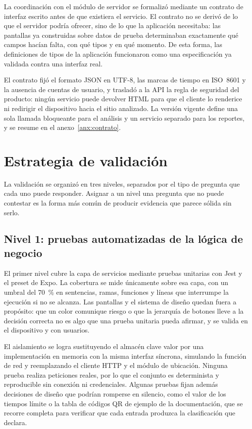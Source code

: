 La coordinación con el módulo de servidor se formalizó mediante un contrato de interfaz escrito antes de que existiera el servicio. El contrato no se derivó de lo que el servidor podría ofrecer, sino de lo que la aplicación necesitaba: las pantallas ya construidas sobre datos de prueba determinaban exactamente qué campos hacían falta, con qué tipos y en qué momento. De esta forma, las definiciones de tipos de la aplicación funcionaron como una especificación ya validada contra una interfaz real.

El contrato fijó el formato JSON en UTF-8, las marcas de tiempo en ISO~8601 y la ausencia de cuentas de usuario, y trasladó a la API la regla de seguridad del producto: ningún servicio puede devolver HTML para que el cliente lo renderice ni redirigir el dispositivo hacia el sitio analizado. La versión vigente define una sola llamada bloqueante para el análisis y un servicio separado para los reportes, y se resume en el anexo~\ref{anx:contrato}.

\section{Estrategia de validación}

La validación se organizó en tres niveles, separados por el tipo de pregunta que cada uno puede responder. Asignar a un nivel una pregunta que no puede contestar es la forma más común de producir evidencia que parece sólida sin serlo.

\subsection{Nivel 1: pruebas automatizadas de la lógica de negocio}

El primer nivel cubre la capa de servicios mediante pruebas unitarias con Jest y el preset de Expo. La cobertura se mide únicamente sobre esa capa, con un umbral del 70~\% en sentencias, ramas, funciones y líneas que interrumpe la ejecución si no se alcanza. Las pantallas y el sistema de diseño quedan fuera a propósito: que un color comunique riesgo o que la jerarquía de botones lleve a la decisión correcta no es algo que una prueba unitaria pueda afirmar, y se valida en el dispositivo y con usuarios.

El aislamiento se logra sustituyendo el almacén clave valor por una implementación en memoria con la misma interfaz síncrona, simulando la función de red y reemplazando el cliente HTTP y el módulo de ubicación. Ninguna prueba realiza peticiones reales, por lo que el conjunto es determinista y reproducible sin conexión ni credenciales. Algunas pruebas fijan además decisiones de diseño que podrían romperse en silencio, como el valor de los tiempos límite o la tabla de códigos QR de ejemplo de la documentación, que se recorre completa para verificar que cada entrada produzca la clasificación que declara.

